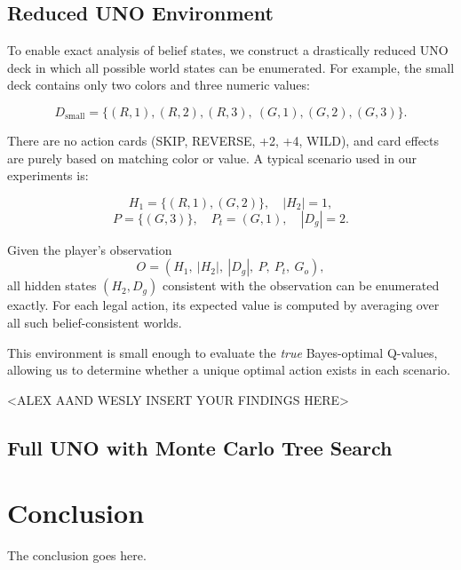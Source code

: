 \documentclass[journal,transmag]{IEEEtran}
\begin{document}
\subsection{Reduced UNO Environment}

To enable exact analysis of belief states, we construct a drastically
reduced UNO deck in which all possible world states can be enumerated.
For example, the small deck contains only two colors and three numeric values:

\[
D_{\text{small}} =
\{(R,1), (R,2), (R,3),\ (G,1), (G,2), (G,3)\}.
\]

There are no action cards (SKIP, REVERSE, +2, +4, WILD), and card effects
are purely based on matching color or value. A typical scenario used in
our experiments is:

\[
H_1 = \{(R,1), (G,2)\},\quad |H_2| = 1,
\]
\[
P = \{(G,3)\},\quad P_t = (G,1),\quad |D_g| = 2.
\]

Given the player's observation
\[
O = (H_1,\ |H_2|,\ |D_g|,\ P,\ P_t,\ G_o),
\]
all hidden states \((H_2, D_g)\) consistent with the observation can be
enumerated exactly. For each legal action, its expected value is computed
by averaging over all such belief-consistent worlds.

This environment is small enough to evaluate the \emph{true}
Bayes-optimal Q-values, allowing us to determine whether a unique
optimal action exists in each scenario.

<ALEX AAND WESLY INSERT YOUR FINDINGS HERE>


\subsection{Full UNO with Monte Carlo Tree Search}





\section{Conclusion}

The conclusion goes here.


\end{document}
